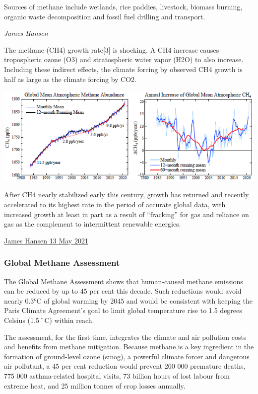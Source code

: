\documentclass[
]{book}
\begin{document}
Sources of methane include wetlands, rice paddies, livestock, biomass burning, organic waste decomposition and fossil fuel drilling and transport.

\emph{James Hansen}

The methane (CH4) growth rate{[}3{]} is shocking.
A CH4 increase causes tropospheric ozone (O3) and stratospheric water vapor (H2O)
to also increase.
Including these indirect effects, the climate forcing by observed CH4 growth
is half as large as the climate forcing by CO2.

\includegraphics{fig/CH4_Annual_Increase.png}

After CH4 nearly stabilized early this century, growth has returned and recently accelerated to its highest rate in the period of accurate global data, with increased growth at least in part as a result of ``fracking'' for gas and reliance on gas as the complement to intermittent renewable energies.

\href{https://mailchi.mp/caa/the-world-has-cooled-off-whats-the-significance}{James Hansen 13 May 2021}

\hypertarget{global-methane-assessment}{%
\subsubsection{Global Methane Assessment}\label{global-methane-assessment}}

The Global Methane Assessment shows that human-caused methane emissions can be reduced by up to 45 per cent this decade. Such reductions would avoid nearly 0.3°C of global warming by 2045 and would be consistent with keeping the Paris Climate Agreement's goal to limit global temperature rise to 1.5 degrees Celsius (1.5˚C) within reach.

The assessment, for the first time, integrates the climate and air pollution costs and benefits from methane mitigation. Because methane is a key ingredient in the formation of ground-level ozone (smog), a powerful climate forcer and dangerous air pollutant, a 45 per cent reduction would prevent 260 000 premature deaths, 775 000 asthma-related hospital visits, 73 billion hours of lost labour from extreme heat, and 25 million tonnes of crop losses annually.
\end{document}
